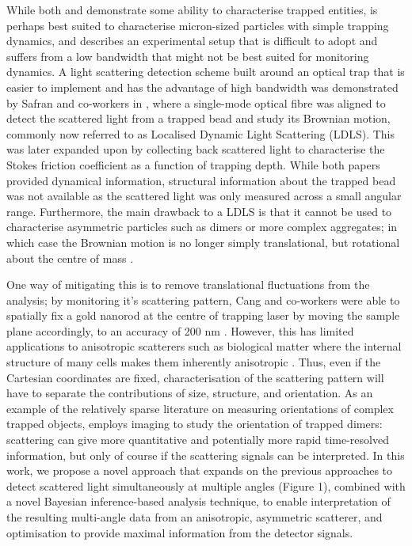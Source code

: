 \documentclass[12pt]{spieman}
\begin{document}
\begin{spacing}{1.5}
While both \cite{Carvalho_2023} and \cite{Watson_2023} demonstrate some ability to characterise trapped entities, \cite{Carvalho_2023} is perhaps best suited to characterise micron-sized particles with simple trapping dynamics, and \cite{Watson_2023} describes an experimental setup that is difficult to adopt and suffers from a low bandwidth that might not be best suited for monitoring dynamics. A light scattering detection scheme built around an optical trap that is easier to implement and has the advantage of high bandwidth was demonstrated by Safran and co-workers in \cite{Bar-Ziv_1998}, where a single-mode optical fibre was aligned to detect the scattered light from a trapped bead and study its Brownian motion, commonly now referred to as Localised Dynamic Light Scattering (LDLS). This was later expanded upon \cite{Viana2002} by collecting back scattered light to characterise the Stokes friction coefficient as a function of trapping depth. While both papers provided dynamical information, structural information about the trapped bead was not available as the scattered light was only measured across a small angular range. Furthermore, the main drawback to a LDLS is that it cannot be used to characterise asymmetric particles such as dimers or more complex aggregates; in which case the Brownian motion is no longer simply translational, but rotational about the centre of mass \cite{yin2013large}. 

One way of mitigating this is to remove translational fluctuations from the analysis; by monitoring it’s scattering pattern, Cang and co-workers were able to spatially fix a gold nanorod at the centre of trapping laser by moving the sample plane accordingly, to an accuracy of 200 nm \cite{Hu2006}. However, this has limited applications to anisotropic scatterers such as biological matter where the internal structure of many cells makes them inherently anisotropic \cite{Watson_2023}. Thus, even if the Cartesian coordinates are fixed, characterisation of the scattering pattern will have to separate the contributions of size, structure, and orientation.  As an example of the relatively sparse literature on measuring orientations of complex trapped objects, \cite{raudsepp2022estimating} employs imaging to study the orientation of trapped dimers: scattering can give more quantitative and potentially more rapid time-resolved information, but only of course if the scattering signals can be interpreted. In this work, we propose a novel approach that expands on the previous approaches \cite{Bar-Ziv_1998} \cite{Viana2002} to detect scattered light simultaneously at multiple angles (Figure 1), combined with a novel Bayesian inference-based analysis technique, to enable interpretation of the resulting multi-angle data from an anisotropic, asymmetric scatterer, and optimisation to provide maximal information from the detector signals. 


\end{spacing}
\end{document}
